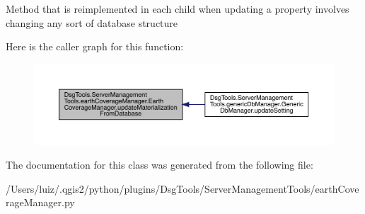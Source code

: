 \begin{DoxyVerb}Method that is reimplemented in each child when updating a property involves changing any sort of database structure
\end{DoxyVerb}
 Here is the caller graph for this function\+:
\nopagebreak
\begin{figure}[H]
\begin{center}
\leavevmode
\includegraphics[width=350pt]{class_dsg_tools_1_1_server_management_tools_1_1earth_coverage_manager_1_1_earth_coverage_manager_a50e332bb5bd3aae306177fc65db5e910_icgraph}
\end{center}
\end{figure}


The documentation for this class was generated from the following file\+:\begin{DoxyCompactItemize}
\item 
/\+Users/luiz/.\+qgis2/python/plugins/\+Dsg\+Tools/\+Server\+Management\+Tools/earth\+Coverage\+Manager.\+py\end{DoxyCompactItemize}
